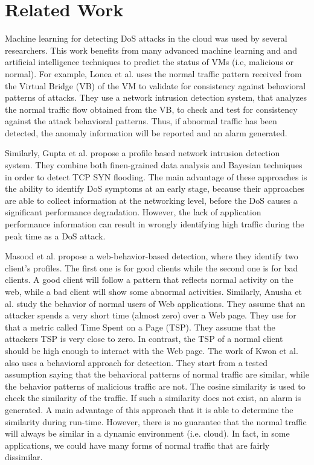 \documentclass[twocolumn]{bmcart}%
\begin{document}
\section*{Related Work}

Machine learning for detecting DoS attacks in the cloud was used by several researchers. This work benefits from many advanced machine learning and and artificial intelligence techniques to predict the status of VMs (i.e, malicious or normal).  For example, Lonea et al. \cite{lonea2013detecting} uses the normal traffic pattern received from the Virtual Bridge (VB) of the VM to validate for consistency against behavioral patterns of attacks. They use a network intrusion detection system, that analyzes the normal traffic flow obtained from the VB, to check and test for consistency against the attack behavioral patterns. Thus, if abnormal traffic has been detected, the anomaly information will be reported and an alarm generated.


Similarly, Gupta et al. \cite{gupta2013vm} propose a profile based network intrusion detection system. They combine both finen-grained data analysis and Bayesian techniques in order to detect TCP SYN flooding. The main advantage of these approaches is the ability to identify DoS symptoms at an early stage, because their approaches are able to collect information at the networking level, before the DoS causes a significant performance degradation. However, the lack of application performance information can result in wrongly identifying high traffic during the peak time as a DoS attack.

Masood et al. \cite{masood2013edos} propose a web-behavior-based detection, where they identify two client's profiles. The first one is for good clients while the second one is for bad clients. A good client will follow a pattern that reflects normal activity on the web, while a bad client will show some abnormal activities. Similarly, Anusha et al. \cite{koduru2013detection} study the behavior of normal users of Web applications. They assume that an attacker spends a very short time (almost zero) over a Web page. They use for that a metric called Time Spent on a Page (TSP). They assume that the attackers TSP is very close to zero. In contrast, the TSP of a normal client should be high enough to interact with the Web page. The work of Kwon et al. \cite{kwon2011self} also uses a behavioral approach for detection. They start from a tested assumption saying that the behavioral patterns of normal traffic are similar, while the behavior patterns of malicious traffic are not. The cosine similarity is used to check the similarity of the traffic. If such a similarity does not exist, an alarm is generated. A main advantage of this approach that it is able to determine the similarity during run-time. However, there is no guarantee that the normal traffic will always be similar in a dynamic environment (i.e. cloud). In fact, in some applications, we could have many forms of normal traffic that are fairly dissimilar.
\end{document}
